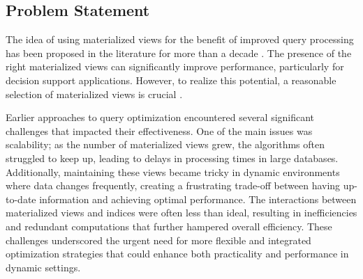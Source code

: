 






\subsection{Problem Statement}
The idea of using materialized views for the benefit of improved query processing has been proposed in the literature for more than a decade \cite{Blakeley1986EfficientlyUM}. The presence of the right materialized views can significantly improve performance, particularly for decision support applications. However, to realize this potential, a reasonable selection of materialized views is crucial \cite{agrawal2000automated}.\vspace{.4cm}

Earlier approaches to query optimization encountered several significant challenges that impacted their effectiveness. One of the main issues was scalability; as the number of materialized views grew, the algorithms often struggled to keep up, leading to delays in processing times in large databases. Additionally, maintaining these views became tricky in dynamic environments where data changes frequently, creating a frustrating trade-off between having up-to-date information and achieving optimal performance. The interactions between materialized views and indices were often less than ideal, resulting in inefficiencies and redundant computations that further hampered overall efficiency. These challenges underscored the urgent need for more flexible and integrated optimization strategies that could enhance both practicality and performance in dynamic settings.\vspace{.4cm}

